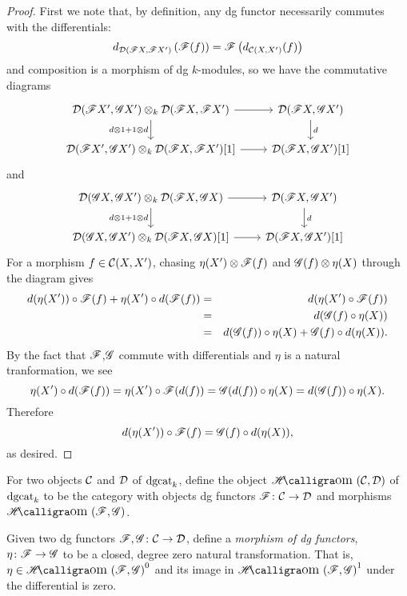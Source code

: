 \documentclass[dissertation.tex]{subfiles}
\begin{document}
\begin{prop}
\begin{proof}
    First we note that, by definition, any dg functor necessarily commutes with the differentials:
    $$d_{\mathcal{D}(\mathscr{F}X, \mathscr{F}X^\prime)}\left(\mathscr{F}(f) \right) = \mathscr{F}\left(d_{\mathcal{C}(X,X^\prime)}(f)\right)$$
    and composition is a morphism of dg $k$-modules, so we have the commutative diagrams
    $$\begin{tikzcd}
      \D(\F X^\prime, \G X^\prime) \otimes_k \D(\F X, \F X^\prime) \arrow{r}\arrow[swap]{d}{d \otimes 1 + 1 \otimes d}& \D(\F X, \G X^\prime)\arrow{d}{d}\\
      \D(\F X^\prime, \G X^\prime) \otimes_k \D(\F X, \F X^\prime)[1] \arrow{r}& \D(\F X, \G X^\prime)[1]
    \end{tikzcd}$$
    and
    $$\begin{tikzcd}
      \D(\G X, \G X^\prime) \otimes_k \D(\F X, \G X) \arrow{r}\arrow[swap]{d}{d \otimes 1 + 1 \otimes d}& \D(\F X, \G X^\prime)\arrow{d}{d}\\
      \D(\G X, \G X^\prime) \otimes_k \D(\F X, \G X)[1] \arrow{r}& \D(\F X, \G X^\prime)[1]
    \end{tikzcd}$$
    For a morphism $f \in \mathcal{C}(X,X^\prime)$, chasing $\eta(X^\prime) \otimes \mathscr{F}(f)$ and $\mathscr{G}(f) \otimes \eta(X)$ through the diagram gives
    \begin{eqnarray*}
      d(\eta(X^\prime)) \circ \mathscr{F}(f) + \eta(X^\prime) \circ d(\mathscr{F}(f)) 
      &=& d(\eta(X^\prime) \circ \mathscr{F}(f))\\
      &=& d(\mathscr{G}(f) \circ \eta(X))\\
      &=& d(\mathscr{G}(f)) \circ \eta(X) + \mathscr{G}(f) \circ d(\eta(X)).
    \end{eqnarray*}
    By the fact that $\mathscr{F}$,$\mathscr{G}$ commute with differentials and $\eta$ is a natural tranformation, we see
    $$\eta(X^\prime) \circ d(\mathscr{F}(f)) = \eta(X^\prime) \circ \mathscr{F}(d(f)) = \mathscr{G}(d(f)) \circ \eta(X) = d(\mathscr{G}(f)) \circ \eta(X).$$
    Therefore
    $$d(\eta(X^\prime)) \circ \mathscr{F}(f) = \mathscr{G}(f) \circ d(\eta(X)),$$
    as desired.
  \end{proof}
\end{prop}

\begin{defn}
  For two objects $\mathcal{C}$ and $\mathcal{D}$ of $\operatorname{dgcat}_k$, define the object $\SHom{\C,\D}$ of $\operatorname{dgcat}_k$ to be the category with objects dg functors $\mathscr{F} \colon \mathcal{C} \rightarrow \mathcal{D}$ and morphisms $\SHom{\mathscr{F},\mathscr{G}}$.
  
  Given two dg functors $\mathscr{F},\mathscr{G} \colon \mathcal{C} \rightarrow \mathcal{D}$, define a {\it morphism of dg functors}, $\eta \colon \mathscr{F} \rightarrow \mathscr{G}$ to be a closed, degree zero natural transformation.
  That is, $\eta \in \SHom{\F, \G}^0$ and its image in $\SHom{\F,\G}^1$ under the differential is zero.
\end{defn}
\end{document}
